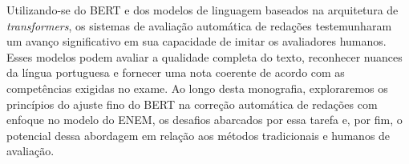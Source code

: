 Utilizando-se do BERT e dos modelos de linguagem baseados na arquitetura de \textit{transformers}, os sistemas de avaliação automática de redações testemunharam um avanço significativo em sua capacidade de imitar os avaliadores humanos. Esses modelos podem avaliar a qualidade completa do texto, reconhecer nuances da língua portuguesa e fornecer uma nota coerente de acordo com as competências exigidas no exame. Ao longo desta monografia, exploraremos os princípios do ajuste fino do BERT na correção automática de redações com enfoque no modelo do ENEM, os desafios abarcados por essa tarefa e, por fim, o potencial dessa abordagem em relação aos métodos tradicionais e humanos de avaliação.
